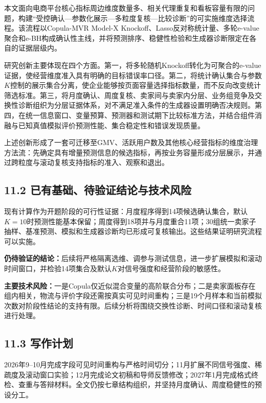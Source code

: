 \documentclass[UTF8,12pt,a4paper]{ctexart}
\begin{document}
本文面向电商平台核心指标周边维度数量多、相关代理重复和看板容量有限的问题，构建“受控确认—参数化展示—多粒度复核—比较诊断”的可实施维度选择流程。该流程以Copula-MVR Model-X Knockoff、Lasso反对称统计量、多轮e-value聚合和e-BH构成确认性主线，并将预测排序、稳健性检验和生成器诊断限定在各自的证据层级内。

研究创新主要体现在四个方面。第一，将多轮随机Knockoff转化为可聚合的e-value证据，使经营维度准入具有明确的目标错误率口径。第二，将统计确认集合与参数$K$控制的展示集合分离，使企业能够按页面容量选择指标数量，而不反向改变统计筛选标准。第三，将月度确认、周度复核、卖家间与卖家内分层、业务组竞争及交换性诊断组织为分层证据体系，对不满足准入条件的生成器设置明确否决规则。第四，在统一信息窗口、变量预算、预测器和测试期下比较标准方法，并结合组件消融与已知真值模拟评价预测性能、集合稳定性和错误发现质量。

上述创新形成了一套可迁移至GMV、活跃用户数及其他核心经营指标的维度治理方法流：先确定具有增量预测信息的候选指标，再按业务容量形成分层展示，并通过跨粒度与滚动复核支持指标的准入、观察和退出。

\subsection*{11.2 已有基础、待验证结论与技术风险}

现有计算作为开题阶段的可行性证据：月度程序得到14项候选确认集合，默认$K=10$时预测性能基本保留；周度得到18项并与月度重合11项；30组统一卖家子抽样、基准预测、模拟和生成器诊断均已形成可复核输出。这些结果证明研究流程可以实施。

\textbf{仍待验证的结论：}后续将严格隔离选维、调参与测试信息，进一步扩展模拟和滚动时间窗口，并检验14项集合及默认$K$对信号强度和经营阶段的敏感性。

\textbf{主要技术风险：}一是Copula仅近似混合变量的高阶联合分布；二是卖家面板存在组内相关，物流与评价字段还需按真实可见时间重构；三是19个月样本和当前模拟次数对阶段性结论的支持有限。后续分析将围绕交换性诊断、时间口径和滚动复核进行处理。

\subsection*{11.3 写作计划}

2026年9--10月完成字段可见时间重构与严格时间切分；11月扩展不同信号强度、稀疏度及滚动窗口实验；12月完成论文初稿和导师反馈修改；2027年1月完成格式终检、查重与答辩材料。全文仍按七章结构组织，并坚持月度确认、周度稳健性的预设分工。
\end{document}
